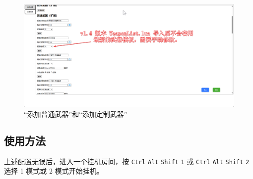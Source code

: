 \begin{figure}[H]
    \Centering
    \includegraphics[width=\textwidth]{assets/weapons_for_previous_versions}
    \caption{“添加普通武器”和“添加定制武器”}
\end{figure}

\subsection{使用方法}

上述配置无误后，进入一个挂机房间，按 \lstinline{Ctrl} \lstinline{Alt} \lstinline{Shift} \lstinline{1} 或 \lstinline{Ctrl} \lstinline{Alt} \lstinline{Shift} \lstinline{2} 选择 1 模式或 2 模式开始挂机。